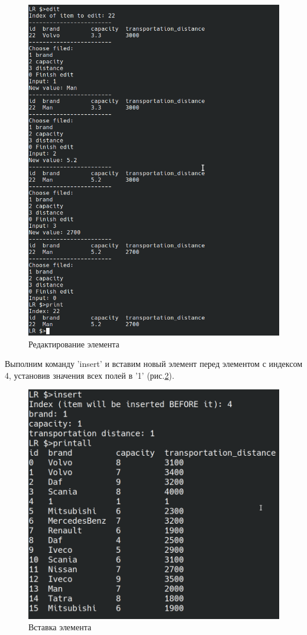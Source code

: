 \begin{figure}[H]
    \centering
    \includegraphics[width=0.9\linewidth]{photo/test.edit}
    \caption{Редактирование элемента}
    \label{test.edit}
\end{figure}

Выполним команду 'insert' и вставим новый элемент
перед элементом с индексом 4, установив значения всех
полей в '1' (рис.\ref{test.insert}). 

\begin{figure}[H]
    \centering
    \includegraphics[width=0.9\linewidth]{photo/test.insert}
    \caption{Вставка элемента}
    \label{test.insert}
\end{figure}


